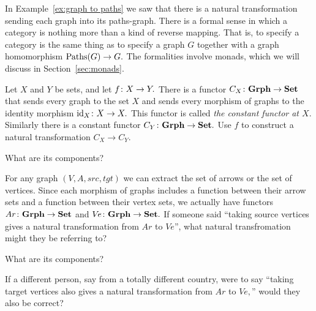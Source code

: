 \documentclass[../main/CT4S-EN-RU]{subfiles}
\begin{document}
\begin{exampleRUS}\label{ex:concat paths of paths}
\end{exampleRUS}

\begin{remarkENG}
In Example~\ref{ex:graph to paths} we saw that there is a natural transformation sending each graph into its paths-graph. There is a formal sense in which a category is nothing more than a kind of reverse mapping. That is, to specify a category is the same thing as to specify a graph $G$ together with a graph homomorphism $\operatorname{Paths}(G)\rightarrow G.$ The formalities involve monads, which we will discuss in Section~\ref{sec:monads}.
\end{remarkENG}

\begin{remarkRUS}
\end{remarkRUS}

\begin{exerciseENG}
Let $X$ and $Y$ be sets, and let $f\colon X\rightarrow Y.$ There is a functor $C_X\colon{\mathbf{Grph}}\rightarrow{\mathbf{Set}}$ that sends every graph to the set $X$ and sends every morphism of graphs to the identity morphism $\operatorname{id}_X\colon X\rightarrow X.$ This functor is called {\em the constant functor at $X$}. Similarly there is a constant functor $C_Y\colon{\mathbf{Grph}}\rightarrow{\mathbf{Set}}.$
\sexc Use $f$ to construct a natural transformation $C_X\to C_Y.$
\item What are its components?
\endsexc
\end{exerciseENG}

\begin{exerciseRUS}
\end{exerciseRUS}

\begin{exerciseENG}
For any graph $(V,A,src,tgt)$ we can extract the set of arrows or the set of vertices. Since each morphism of graphs includes a function between their arrow sets and a function between their vertex sets, we actually have functors $Ar\colon{\mathbf{Grph}}\rightarrow{\mathbf{Set}}$ and $V\!e\colon{\mathbf{Grph}}\rightarrow{\mathbf{Set}}.$
\sexc If someone said “taking source vertices gives a natural transformation from $Ar$ to $V\!e$”, what natural transfromation might they be referring to?
\item What are its components? 
\item If a different person, say from a totally different country, were to say “taking target vertices also gives a natural transformation from $Ar$ to $V\!e,$” would they also be correct?
\endsexc
\end{exerciseENG}
\end{document}
